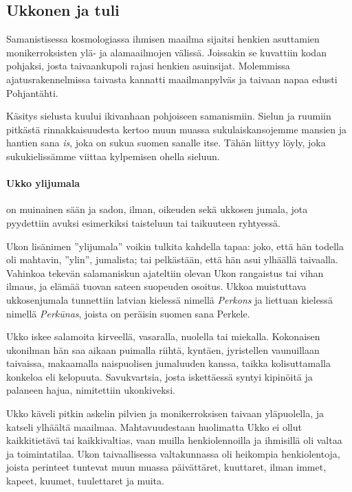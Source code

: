 \subsection{Ukkonen ja tuli}

    Samanistisessa kosmologiassa ihmisen maailma sijaitsi henkien asuttamien 
    monikerroksisten ylä- ja alamaailmojen välissä. Joissakin se kuvattiin kodan pohjaksi, josta 
    taivaankupoli rajasi henkien asuinsijat. Molemmissa ajatusrakennelmissa taivasta kannatti 
    maailmanpylväs ja taivaan napaa edusti Pohjantähti. \par Käsitys sielusta kuului ikivanhaan 
    pohjoiseen samanismiin. Sielun ja ruumiin pitkästä rinnakkaisuudesta kertoo muun muassa 
    sukulaiskansojemme mansien ja hantien sana \emph{is}, joka on sukua suomen sanalle itse. Tähän 
    liittyy löyly, joka sukukielissämme viittaa kylpemisen ohella sieluun. 
  \paragraph{Ukko ylijumala} on muinainen sään ja sadon, ilman, oikeuden sekä 
    ukkosen jumala, jota pyydettiin avuksi esimerkiksi taisteluun tai taikuuteen ryhtyessä.
    
    Ukon lisänimen ”ylijumala” voikin tulkita kahdella tapaa: joko, että hän todella oli mahtavin, 
    ”ylin”, jumalista; tai pelkästään, että hän asui ylhäällä taivaalla. Vahinkoa tekevän 
    salamaniskun ajateltiin olevan Ukon rangaistus tai vihan ilmaus, ja elämää tuovan sateen 
    suopeuden osoitus. Ukkoa muistuttava ukkosenjumala tunnettiin latvian kielessä nimellä 
    \emph{Perkons} ja liettuan kielessä nimellä \emph{Perkūnas}, joista on peräisin suomen sana Perkele. 

    Ukko iskee salamoita kirveellä, vasaralla, nuolella tai miekalla. Kokonaisen ukonilman hän saa 
    aikaan puimalla riihtä, kyntäen, jyristellen vaunuillaan taivaissa, makaamalla naispuolisen 
    jumaluuden kanssa, taikka kolisuttamalla konkeloa eli kelopuuta. Savukvartsia, josta 
    iskettäessä syntyi kipinöitä ja palaneen hajua, nimitettiin ukonkiveksi. 

    Ukko käveli pitkin askelin pilvien ja monikerroksisen taivaan yläpuolella, ja katseli 
    ylhäältä maailmaa. Mahtavuudestaan huolimatta Ukko ei ollut kaikkitietävä tai kaikkivaltias, 
    vaan muilla henkiolennoilla ja ihmisillä oli valtaa ja toimintatilaa. Ukon taivaallisessa 
    valtakunnassa oli heikompia henkiolentoja, joista perinteet tuntevat muun muassa päivättäret, 
    kuuttaret, ilman immet, kapeet, kuumet, tuulettaret ja muita. 

